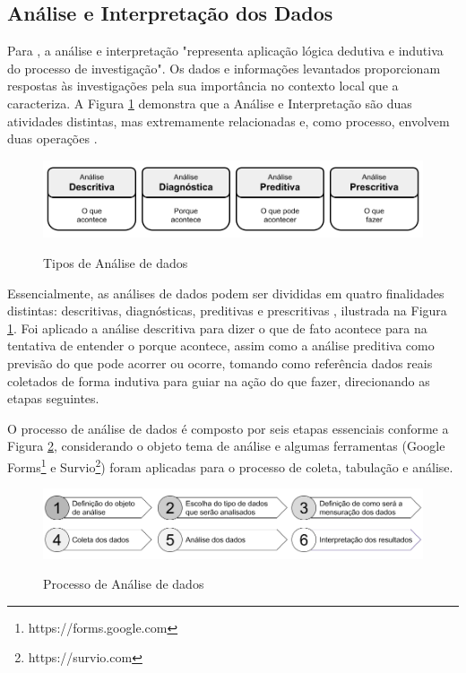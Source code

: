 \subsection{Análise e Interpretação dos Dados}
\label{analise_dados}

Para , a análise e interpretação "representa aplicação lógica dedutiva e indutiva do processo de investigação". Os dados e informações levantados proporcionam respostas às investigações pela sua importância no contexto local que a caracteriza. A Figura \ref{fig:tipos_analise_dados} demonstra que a Análise e Interpretação são duas atividades distintas, mas extremamente relacionadas e, como processo, envolvem duas operações \cite{marconi2017fundamentos}.

\begin{figure}[h!]
    \caption{Tipos de Análise de dados}
    \centering
    \includegraphics[scale=0.4]{figuras/tipos_analise_dados.png}
    \label{fig:tipos_analise_dados}
\end{figure}


Essencialmente, as análises de dados podem ser divididas em quatro finalidades distintas: descritivas, diagnósticas, preditivas e prescritivas \cite{marquesone2016big}, ilustrada na Figura \ref{fig:tipos_analise_dados}. Foi aplicado a análise descritiva para dizer o que de fato acontece para na tentativa de entender o porque acontece, assim como a análise preditiva como previsão do que pode acorrer ou ocorre, tomando como referência dados reais coletados de forma indutiva para guiar na ação do que fazer, direcionando as etapas seguintes.

O processo de análise de dados é composto por seis etapas essenciais conforme a Figura \ref{fig:processo_analise_dados}, considerando o objeto tema de análise e algumas ferramentas (Google Forms\footnote{https://forms.google.com} e Survio\footnote{https://survio.com}) foram aplicadas para o processo de coleta, tabulação e análise.

\begin{figure}[h!]
    \caption{Processo de Análise de dados}
    \centering
    \includegraphics[scale=0.45]{figuras/processo_analise_dados.png}
    \label{fig:processo_analise_dados}
\end{figure}

